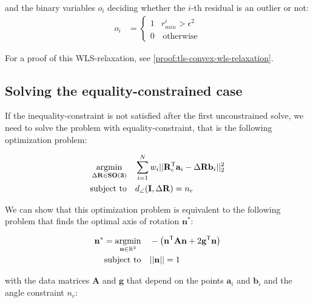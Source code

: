 and the binary variables $o_i$ deciding whether the $i$-th residual is an outlier or not:
\begin{equation}
	\begin{aligned}	
		o_i &= \begin{cases}
			1 &  r_{min}^i > \epsilon^2\\
			0 & \, \text{otherwise}
		\end{cases}
	\end{aligned}
\end{equation}

For a proof of this WLS-relaxation, see \ref{proof:tls-convex-wls-relaxation}.


\subsection{Solving the equality-constrained case}


If the inequality-constraint is not satisfied after the first unconstrained solve, we need to solve the problem with equality-constraint, that is the following optimization problem: 

\begin{equation}
	\label{eq:tls-rwls-eq}
	\begin{aligned}
		\operatorname*{argmin}_{\Delta \mathbf{R} \in \mathbf{SO(3)}}  \quad &\sum_{i=1}^{N} w_i ||\mathbf{R}_c^{\mathsf{T}} \mathbf{a}_i - \Delta\mathbf{R} \mathbf{b}_i ||_2^2 \\
		\text{subject to} \quad &d_{\angle}(\mathbf{I}, \Delta\mathbf{R}) = n_r
	\end{aligned}
\end{equation}

We can show that this optimization problem is equivalent to the following problem that finds the optimal axis of rotation $\mathbf{n}^*$:

\begin{equation}
	\begin{aligned}
		\label{eq:eq-constrained-prob-ev}
		\mathbf{n}^* = \operatorname*{argmin}_{\mathbf{n} \in \mathbb{R}^3} \quad &-\left(\mathbf{n}^{\mathsf{T}} \mathbf{A} \mathbf{n} + 2 \mathbf{g}^{\mathsf{T}} \mathbf{n} \right)\\
		\text{subject to} \quad &|| \mathbf{n}|| = 1\\
	\end{aligned}
\end{equation}

with the data matrices $\mathbf{A}$ and $\mathbf{g}$ that depend on the points $\mathbf{a}_i$ and $\mathbf{b}_i$ and the angle constraint $n_r$:

